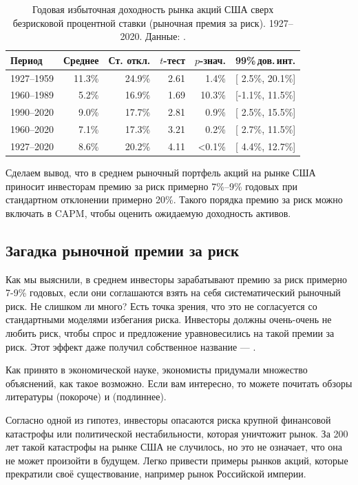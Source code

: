 \begin{table}[h]
\centering
\begin{tabular}{l|r|r|r|r|c}
Период & Среднее & Ст. откл. & $t$-тест & $p$-знач. & 99\%\,дов.\,инт. \\
\hline
1927--1959 & 11.3\% & 24.9\% & 2.61 &  1.4\% & [ 2.5\%, 20.1\%] \\ 
1960--1989 &  5.2\% & 16.9\% & 1.69 & 10.3\% & [-1.1\%, 11.5\%] \\
1990--2020 &  9.0\% & 17.7\% & 2.81 &  0.9\% & [ 2.5\%, 15.5\%] \\
1960--2020 &  7.1\% & 17.3\% & 3.21 &  0.2\% & [ 2.7\%, 11.5\%] \\ \hline
1927--2020 &  8.6\% & 20.2\% & 4.11 & <0.1\% & [ 4.4\%, 12.7\%] 
\end{tabular}
\caption{Годовая избыточная доходность рынка акций США сверх безрисковой процентной ставки (рыночная премия за риск). 1927--2020. Данные: \cite{kennethFrench}.}
\label{us_market_risk_premium}
\end{table}

Сделаем вывод, что в среднем рыночный портфель акций на рынке США приносит инвесторам премию за риск примерно 7\%--9\% годовых при стандартном отклонении примерно 20\%. Такого порядка премию за риск можно включать в CAPM, чтобы оценить ожидаемую доходность активов.

\subsection{Загадка рыночной премии за риск}

Как мы выяснили, в среднем инвесторы зарабатывают премию за риск примерно 7-9\%  годовых, если они соглашаются взять на себя систематический рыночный риск. Не слишком ли много? Есть точка зрения, что это не согласуется со стандартными моделями избегания риска. Инвесторы должны очень-очень не любить риск, чтобы спрос и предложение уравновесились на такой премии за риск. Этот эффект даже получил собственное название --- .

Как принято в экономической науке, экономисты придумали множество объяснений, как такое возможно. Если вам интересно, то можете почитать обзоры литературы \cite{siegel1997anomalies} (покороче) и \cite{mehra2007equity} (подлиннее).

Согласно одной из гипотез, инвесторы опасаются риска крупной финансовой катастрофы или политической нестабильности, которая уничтожит рынок. За 200 лет такой катастрофы на рынке США не случилось, но это не означает, что она не может произойти в будущем. Легко привести примеры рынков акций, которые прекратили своё существование, например рынок Российской империи.


